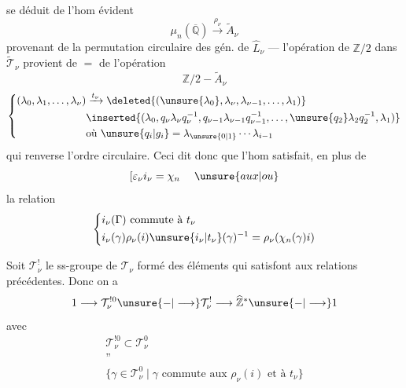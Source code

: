 se déduit de l'hom évident
\[
\mu_n(\overline{\mathbb Q})\xrightarrow{\rho_\nu}\widetilde A_\nu
\]
provenant de la permutation circulaire des
gén. de $\widehat L_\nu$ --- l'opération de
$\mathbb Z/2$ dans $\widetilde{\mathcal T}_\nu$ provient de $=$ de
l'opération
\[
\mathbb Z/2-\widetilde A_\nu
\]
\[
\left\{\begin{aligned}
(\lambda_0,\lambda_1,\ldots,\lambda_\nu)&\xrightarrow{t_\nu}
\deleted{(\unsure{\lambda_0},\lambda_\nu,\lambda_{\nu-1},\ldots,\lambda_1)}\\
&\inserted{(\lambda_0,q_\nu\lambda_\nu q_\nu^{-1},
q_{\nu-1}\lambda_{\nu-1}q_{\nu-1}^{-1},\ldots,
\unsure{q_2}\lambda_2q_2^{-1},\lambda_1)}\\
&\text{où }\unsure{q_i|g_i}=\lambda_{\unsure{0|1}}\cdots\lambda_{i-1}
\end{aligned}\right.
\]
qui renverse l'ordre circulaire.
Ceci dit donc que l'hom
satisfait, en plus de
\[
\left[\varepsilon_\nu i_\nu=\chi_n\right.\quad\unsure{aux|ou}
\]
la relation
\[
\left\{\begin{aligned}
&i_\nu(\Gamma)\text{ commute à }t_\nu\\
&i_\nu(\gamma)\rho_\nu(i)\unsure{i_\nu|t_\nu}(\gamma)^{-1}
=\rho_\nu(\chi_n(\gamma)i)
\end{aligned}\right.
\]

Soit $\mathcal T_\nu^!$ le ss-groupe de $\mathcal T_\nu$
formé des éléments qui satisfont
aux relations précédentes. Donc on a
\[
1\longrightarrow\mathcal T_\nu^{!0}\unsure{-|\longrightarrow}\mathcal T_\nu^!\longrightarrow\widehat{\mathbb Z}^{*}\unsure{-|\longrightarrow}1
\]
avec
\[
\begin{gathered}
\mathcal T_\nu^{!0}\subset\mathcal T_\nu^0\\
\text{''}\\
\{\gamma\in\mathcal T_\nu^0\mid\gamma\text{ commute aux }\rho_\nu(i)
\text{ et à }t_\nu\}
\end{gathered}
\]

